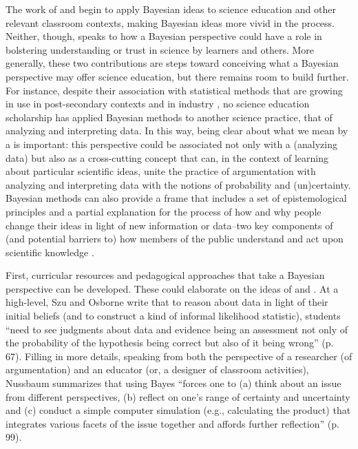 \documentclass[man]{apa7}
\begin{document}
The work of \textcite{so12} and \textcite{n11} begin to apply Bayesian ideas to science education and other relevant classroom contexts, making Bayesian ideas more vivid in the process. Neither, though, speaks to how a Bayesian perspective could have a role in bolstering understanding or trust in science by learners and others. More generally, these two contributions are steps toward conceiving what a Bayesian perspective may offer science education, but there remains room to build further. For instance, despite their association with statistical methods that are growing in use in post-secondary contexts and in industry \parencite{mcgrayne2011theory}, no science education scholarship has applied Bayesian methods to another science practice, that of analyzing and interpreting data. In this way, being clear about what we mean by a  is important: this perspective could be associated not only with a  (analyzing data) but also as a cross-cutting concept \parencite{nrc12} that can, in the context of learning about particular scientific ideas, unite the practice of argumentation with analyzing and interpreting data with the notions of probability and (un)certainty. Bayesian methods can also provide a frame that includes a set of epistemological principles and a partial explanation for the process of how and why people change their ideas in light of new information or data--two key components of (and potential barriers to) how members of the public understand and act upon scientific knowledge \parencite{sinatra2014addressing}.

First, curricular resources and pedagogical approaches that take a Bayesian perspective can be developed. These could elaborate on the ideas of \textcite{so12} and \textcite{n11}. At a high-level, Szu and Osborne write that to reason about data in light of their initial beliefs (and to construct a kind of informal likelihood statistic), students “need to see judgments about data and evidence being an assessment not only of the probability of the hypothesis being correct but also of it being wrong” (p. 67). Filling in more details, speaking from both the perspective of a researcher (of argumentation) and an educator (or, a designer of classroom activities), Nussbaum summarizes that using Bayes “forces one to (a) think about an issue from different perspectives, (b) reflect on one’s range of certainty and uncertainty and (c) conduct a simple computer simulation (e.g., calculating the product) that integrates various facets of the issue together and affords further reflection” (p. 99). 
\end{document}

